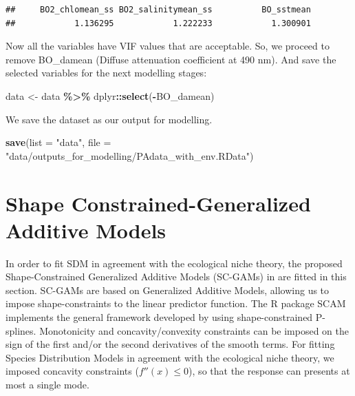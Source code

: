 \documentclass[
]{book}
\newenvironment{Shaded}{\begin{snugshade}}{\end{snugshade}}
\newcommand{\AttributeTok}[1]{\textcolor[rgb]{0.13,0.29,0.53}{#1}}
\newcommand{\FunctionTok}[1]{\textcolor[rgb]{0.13,0.29,0.53}{\textbf{#1}}}
\newcommand{\NormalTok}[1]{#1}
\newcommand{\OtherTok}[1]{\textcolor[rgb]{0.56,0.35,0.01}{#1}}
\newcommand{\SpecialCharTok}[1]{\textcolor[rgb]{0.81,0.36,0.00}{\textbf{#1}}}
\newcommand{\StringTok}[1]{\textcolor[rgb]{0.31,0.60,0.02}{#1}}
\begin{document}
\begin{verbatim}
##     BO2_chlomean_ss BO2_salinitymean_ss          BO_sstmean 
##            1.136295            1.222233            1.300901
\end{verbatim}

Now all the variables have VIF values that are acceptable. So, we proceed to remove BO\_damean (Diffuse attenuation coefficient at 490 nm). And save the selected variables for the next modelling stages:

\begin{Shaded}
\begin{Highlighting}[]
\NormalTok{data }\OtherTok{\textless{}{-}}\NormalTok{ data }\SpecialCharTok{\%\textgreater{}\%}
\NormalTok{    dplyr}\SpecialCharTok{::}\FunctionTok{select}\NormalTok{(}\SpecialCharTok{{-}}\NormalTok{BO\_damean)}
\end{Highlighting}
\end{Shaded}

We save the dataset as our output for modelling.

\begin{Shaded}
\begin{Highlighting}[]
\FunctionTok{save}\NormalTok{(}\AttributeTok{list =} \StringTok{"data"}\NormalTok{, }\AttributeTok{file =} \StringTok{"data/outputs\_for\_modelling/PAdata\_with\_env.RData"}\NormalTok{)}
\end{Highlighting}
\end{Shaded}

\chapter{Shape Constrained-Generalized Additive Models}\label{shape-constrained-generalized-additive-models}

In order to fit SDM in agreement with the ecological niche theory, the proposed Shape-Constrained Generalized Additive Models (SC-GAMs) in \citep{citores_etal_2020} are fitted in this section. SC-GAMs are based on Generalized Additive Models, allowing us to impose shape-constraints to the linear predictor function. The R package SCAM implements the general framework developed by \citep{pya_etal_2015} using shape-constrained P-splines. Monotonicity and concavity/convexity constraints can be imposed on the sign of the first and/or the second derivatives of the smooth terms. For fitting Species Distribution Models in agreement with the ecological niche theory, we imposed concavity constraints (\(f''(x) \le 0\)), so that the response can presents at most a single mode.
\end{document}
